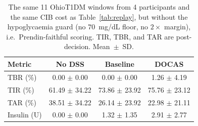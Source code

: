 \begin{table}[pos=htbp,width=0.72\linewidth]
\centering
\caption{The same 11 OhioT1DM windows from 4 participants and the same CIB cost as Table~\ref{tab:replay}, but without the hypoglycaemia guard (no $70$~mg/dL floor, no $2\times$ margin), i.e.\ Prendin-faithful scoring. TIR, TBR, and TAR are post-decision. Mean~$\pm$~SD.}
\label{tab:unguarded}
\scriptsize
\begin{tabular}{lccc}
\toprule
Metric & No DSS & Baseline & DOCAS \\
\midrule
TBR (\%) & 0.00 $\pm$ 0.00 & 0.00 $\pm$ 0.00 & 1.26 $\pm$ 4.19 \\
TIR (\%) & 61.49 $\pm$ 34.22 & 73.86 $\pm$ 23.92 & 75.76 $\pm$ 23.12 \\
TAR (\%) & 38.51 $\pm$ 34.22 & 26.14 $\pm$ 23.92 & 22.98 $\pm$ 21.11 \\
Insulin (U) & 0.00 $\pm$ 0.00 & 1.32 $\pm$ 1.35 & 2.91 $\pm$ 2.77 \\
\bottomrule
\end{tabular}
\end{table}
